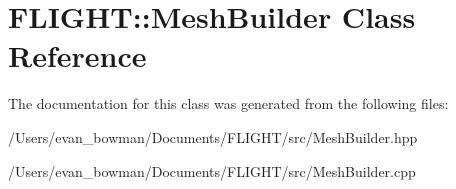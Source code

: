 \hypertarget{class_f_l_i_g_h_t_1_1_mesh_builder}{}\section{F\+L\+I\+G\+HT\+:\+:Mesh\+Builder Class Reference}
\label{class_f_l_i_g_h_t_1_1_mesh_builder}


The documentation for this class was generated from the following files\+:\begin{DoxyCompactItemize}
\item 
/\+Users/evan\+\_\+bowman/\+Documents/\+F\+L\+I\+G\+H\+T/src/Mesh\+Builder.\+hpp\item 
/\+Users/evan\+\_\+bowman/\+Documents/\+F\+L\+I\+G\+H\+T/src/Mesh\+Builder.\+cpp\end{DoxyCompactItemize}
